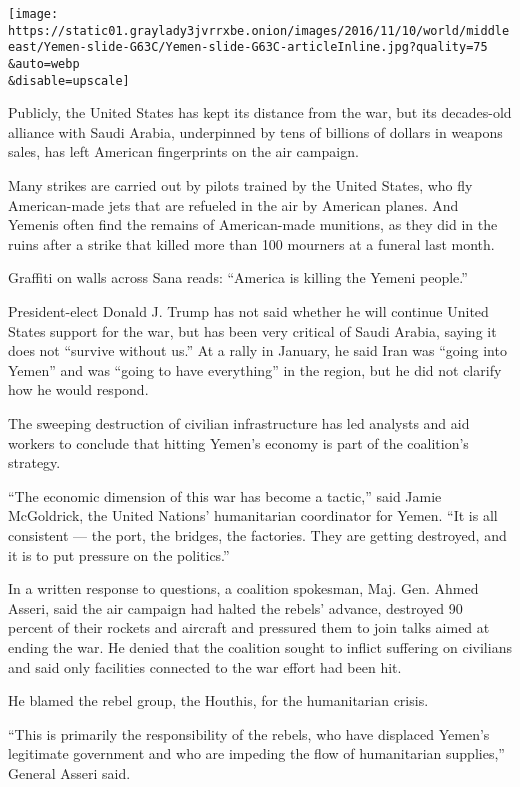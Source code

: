 \texttt{[image: https://static01.graylady3jvrrxbe.onion/images/2016/11/10/world/middleeast/Yemen-slide-G63C/Yemen-slide-G63C-articleInline.jpg?quality=75\\\&auto=webp\\\&disable=upscale]}

Publicly, the United States has kept its distance from the war, but its
decades-old alliance with Saudi Arabia, underpinned by tens of billions
of dollars in weapons sales, has left American fingerprints on the air
campaign.

Many strikes are carried out by pilots trained by the United States, who
fly American-made jets that are refueled in the air by American planes.
And Yemenis often find the remains of American-made munitions, as they
did in the ruins after a strike that killed more than 100 mourners at a
funeral last month.

Graffiti on walls across Sana reads: ``America is killing the Yemeni
people.''

President-elect Donald J. Trump has not said whether he will continue
United States support for the war, but has been very critical of Saudi
Arabia, saying it does not ``survive without us.'' At a rally in
January, he said Iran was ``going into Yemen'' and was ``going to have
everything'' in the region, but he did not clarify how he would respond.

The sweeping destruction of civilian infrastructure has led analysts and
aid workers to conclude that hitting Yemen's economy is part of the
coalition's strategy.

``The economic dimension of this war has become a tactic,'' said Jamie
McGoldrick, the United Nations' humanitarian coordinator for Yemen. ``It
is all consistent --- the port, the bridges, the factories. They are
getting destroyed, and it is to put pressure on the politics.''

In a written response to questions, a coalition spokesman, Maj. Gen.
Ahmed Asseri, said the air campaign had halted the rebels' advance,
destroyed 90 percent of their rockets and aircraft and pressured them to
join talks aimed at ending the war. He denied that the coalition sought
to inflict suffering on civilians and said only facilities connected to
the war effort had been hit.

He blamed the rebel group, the Houthis, for the humanitarian crisis.

``This is primarily the responsibility of the rebels, who have displaced
Yemen's legitimate government and who are impeding the flow of
humanitarian supplies,'' General Asseri said.

